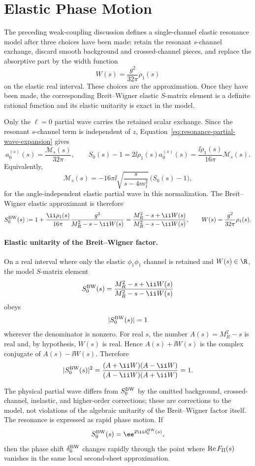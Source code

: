 \section{Elastic Phase Motion}

The preceding weak-coupling discussion defines a single-channel elastic
resonance model after three choices have been made: retain the resonant
\(s\)-channel exchange, discard smooth background and crossed-channel pieces,
and replace the absorptive part by the width function
\[
  W(s)=\frac{g^2}{32\pi}\rho_1(s)
\]
on the elastic real interval.  These choices are the approximation.  Once they
have been made, the corresponding Breit--Wigner elastic \(S\)-matrix element is
a definite rational function and its elastic unitarity is exact in the model.

Only the \(\ell=0\) partial wave carries the retained scalar exchange.  Since
the resonant \(s\)-channel term is independent of \(z\),
Equation~\eqref{eq:resonance-partial-wave-expansion} gives
\[
  a_0^{(s)}(s)=\frac{\mathcal M_s(s)}{32\pi},
  \qquad
  S_0(s)-1=2\ii\rho_1(s)a_0^{(s)}(s)
  =
  \frac{\ii\rho_1(s)}{16\pi}\mathcal M_s(s).
\]
Equivalently,
\[
  \mathcal M_s(s)
  =
  -16\pi\ii\sqrt{\frac{s}{s-4m_1^2}}\,
  \bigl(S_0(s)-1\bigr),
\]
for the angle-independent elastic partial wave in this normalization.  The
Breit--Wigner elastic approximant is therefore
\[
  S_0^{\rm BW}(s)
  :=
  1+
  \frac{\ii\rho_1(s)}{16\pi}
  \frac{g^2}{M_R^2-s-\ii W(s)}
  =
  \frac{
    M_R^2-s+\ii W(s)
  }{
    M_R^2-s-\ii W(s)
  },
  \qquad
  W(s)
  =
  \frac{g^2}{32\pi}\rho_1(s).
\]

\paragraph{Elastic unitarity of the Breit--Wigner factor.}
On a real interval where only the elastic \(\phi_1\phi_1\) channel is retained
and \(W(s)\in\R\), the model \(S\)-matrix element
\[
  S_0^{\rm BW}(s)=
  \frac{M_R^2-s+\ii W(s)}{M_R^2-s-\ii W(s)}
\]
obeys
\[
  |S_0^{\rm BW}(s)|=1
\]
wherever the denominator is nonzero.
For real \(s\), the number \(A(s)=M_R^2-s\) is real and, by hypothesis,
\(W(s)\) is real.  Hence \(A(s)+\ii W(s)\) is the complex conjugate of
\(A(s)-\ii W(s)\).  Therefore
\[
  |S_0^{\rm BW}(s)|^2
  =
  \frac{(A+\ii W)(A-\ii W)}{(A-\ii W)(A+\ii W)}
  =
  1 .
\]

The physical partial wave differs from \(S_0^{\rm BW}\) by the omitted
background, crossed-channel, inelastic, and higher-order corrections; these
are corrections to the model, not violations of the algebraic unitarity of the
Breit--Wigner factor itself.  The resonance is expressed as rapid phase
motion. If
\[
  S_0^{\rm BW}(s)=\ee^{2\ii\delta_0^{\rm BW}(s)},
\]
then the phase shift \(\delta_0^{\rm BW}\) changes rapidly through the point
where \(\operatorname{Re}F_{\rm II}(s)\) vanishes in the same local
second-sheet approximation.

